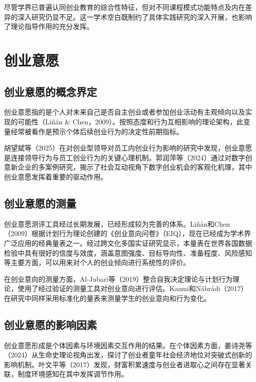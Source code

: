 尽管学界已普遍认同创业教育的综合性特征，但对不同课程模式功能特点及内在差异的深入研究仍显不足。这一学术空白既制约了具体实践研究的深入开展，也影响了理论指导作用的充分发挥。

\section{创业意愿}

\subsection{创业意愿的概念界定}

创业意愿指的是个人对未来自己是否自主创业或者参加创业活动有主观倾向以及实现的可能性\nolinebreak[3]（Liñán \& Chen，2009）\cite{Linan2009}。按照态度和行为互相影响的理论架构，此变量经常被看作是预示个体后续创业行为的决定性前期指标。

胡望斌等\nolinebreak[3]（2025）在对创业型领导对员工内创业行为影响的研究中发现，创业意愿是连接领导行为与员工创业行为的关键心理机制\cite{huwangbin2025}。郭润萍等\nolinebreak[3]（2024）通过对数字创意新企业的多案例研究，揭示了社会互动视角下数字创业机会的客观化机理，其中创业意愿发挥着重要的驱动作用\cite{guorunping2024}。

\subsection{创业意愿的测量}

创业意愿测评工具经过长期发展，已经形成较为完善的体系。Liñán和Chen\nolinebreak[3]（2009）根据计划行为理论创建的\nolinebreak[3]《创业意向问卷》\nolinebreak[3]（EIQ），现在已经成为学术界广泛应用的经典量表之一\cite{Linan2009}。经过跨文化多国实证研究显示，本量表在世界各国数据检验中具有很好的信度与效度，涵盖意图强度、目标导向性、准备程度、风险感知等主要方面，可以用来对个人的创业倾向进行系统性的评价。

在创业意向的测量方面，Al-Jubari等\nolinebreak[3]（2019）整合自我决定理论与计划行为理论，使用了经过验证的测量工具对创业意向进行评估\cite{AlJubari2019}。Kazmi和Nábrádi\nolinebreak[3]（2017）在研究中同样采用标准化的量表来测量学生的创业意向和行为变化\cite{Kazmi2017}。

\subsection{创业意愿的影响因素}

创业意愿形成是个体因素与环境因素交互作用的结果。在个体因素方面，姜诗尧等\nolinebreak[3]（2024）从生命史理论视角出发，探讨了创业者童年社会经济地位对突破式创新的影响机制\cite{jiangshiyao2024}。叶文平等\nolinebreak[3]（2017）发现，财富积累速度与创业者进取心之间存在显著关联，制度环境感知在其中发挥调节作用\cite{yewenping2017}。

